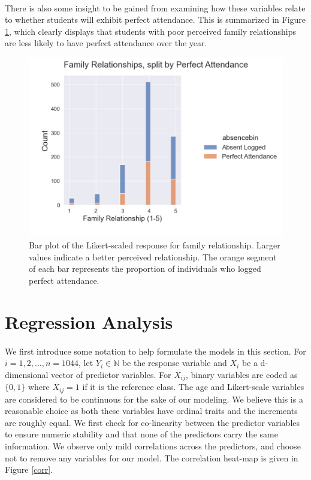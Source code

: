 \documentclass[12pt, titlepage]{article}
\begin{document}
	\paragraph{} There is also some insight to be gained from examining how these variables relate to whether students will exhibit perfect attendance. This is summarized in Figure \ref{famrel}, which clearly displays that students with poor perceived family relationships are less likely to have perfect attendance over the year. 
	
	\begin{figure}[h!]
	\centering
	\includegraphics[width = \textwidth]{fig/famrel.png}
	\caption{Bar plot of the Likert-scaled response for family relationship. Larger values indicate a better perceived relationship. The orange segment of each bar represents the proportion of individuals who logged perfect attendance.}
	\label{famrel}
	\end{figure}
	
	\section{Regression Analysis}
	\paragraph{} We first introduce some notation to help formulate the models in this section. For $i=1, 2, \dots, n = 1044$, let $Y_i \in \mathbb{N}$ be the response variable and $X_i$ be a d-dimensional vector of predictor variables. For $X_{ij}$, binary variables are coded as $\{0,1\}$ where $X_{ij} = 1$ if it is the reference class. The age and Likert-scale variables are considered to be continuous for the sake of our modeling. We believe this is a reasonable choice as both these variables have ordinal traits and the increments are roughly equal. We first check for co-linearity between the predictor variables to ensure numeric stability and that none of the predictors carry the same information. We observe only mild correlations across the predictors, and choose not to remove any variables for our model. The correlation heat-map is given in Figure \ref{corr}.
	
\end{document}
